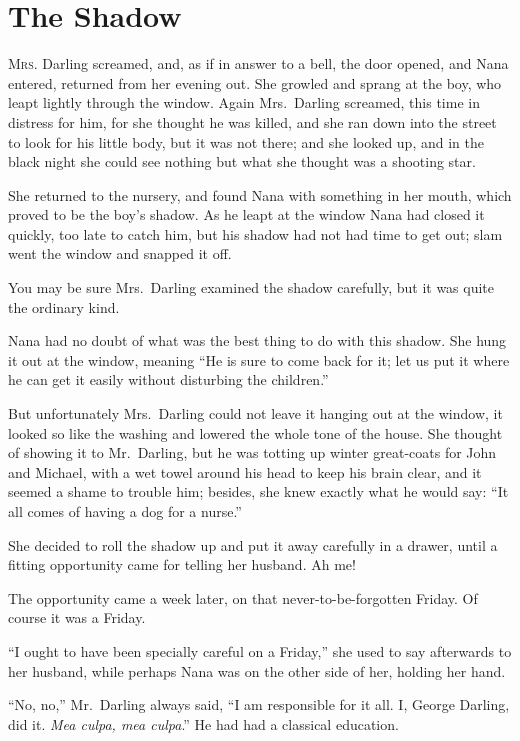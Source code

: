 \chapter{The Shadow}

\lettrine{M}{rs.} Darling screamed, and, as if in answer to a bell, the door
opened, and Nana entered, returned from her evening out. She growled and sprang
at the boy, who leapt lightly through the window. Again Mrs.\ Darling screamed,
this time in distress for him, for she thought he was killed, and she ran down
into the street to look for his little body, but it was not there; and she
looked up, and in the black night she could see nothing but what she thought was
a shooting star.

She returned to the nursery, and found Nana with something in her mouth, which
proved to be the boy's shadow. As he leapt at the window Nana had closed it
quickly, too late to catch him, but his shadow had not had time to get out; slam
went the window and snapped it off.

You may be sure Mrs.\ Darling examined the shadow carefully, but it was quite
the ordinary kind.

Nana had no doubt of what was the best thing to do with this shadow. She hung it
out at the window, meaning ``He is sure to come back for it; let us put it where
he can get it easily without disturbing the children.''

But unfortunately Mrs.\ Darling could not leave it hanging out at the window, it
looked so like the washing and lowered the whole tone of the house. She thought
of showing it to Mr.\ Darling, but he was totting up winter great-coats for John
and Michael, with a wet towel around his head to keep his brain clear, and it
seemed a shame to trouble him; besides, she knew exactly what he would say: ``It
all comes of having a dog for a nurse.''

She decided to roll the shadow up and put it away carefully in a drawer, until a
fitting opportunity came for telling her husband. Ah me!

The opportunity came a week later, on that never-to-be-forgotten Friday. Of
course it was a Friday.

``I ought to have been specially careful on a Friday,'' she used to say
afterwards to her husband, while perhaps Nana was on the other side of her,
holding her hand.

``No, no,'' Mr.\ Darling always said, ``I am responsible for it all. I, George
Darling, did it. \emph{Mea culpa, mea culpa}.'' He had had a classical
education.

